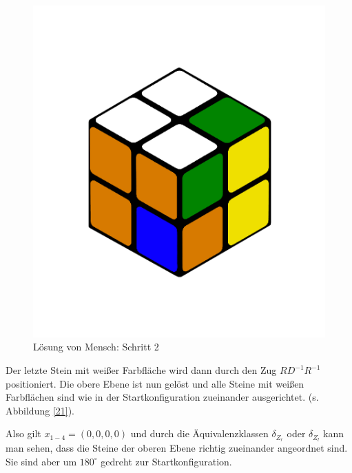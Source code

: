 \documentclass[12pt,a4paper, usenames, dvipsnames]{article}
\begin{document}
\begin{figure}[h]
\centering
\includegraphics[scale=0.12]{menschSchritt2.png}
\caption[Lösung von Mensch: Schritt 2]{Lösung von Mensch: Schritt 2}
\label{20}
\end{figure}

Der letzte Stein mit weißer Farbfläche wird dann durch den Zug $RD^{-1}R^{-1}$ positioniert. Die obere Ebene ist nun gelöst und alle Steine mit weißen Farbflächen sind wie in der Startkonfiguration zueinander ausgerichtet. (s. Abbildung \ref{21}).

Also gilt $x_{1-4} = (0,0,0,0)$ und durch die Äquivalenzklassen $\delta_{Z_r}$ oder $\delta_{Z_l}$ kann man sehen, dass die Steine der oberen Ebene richtig zueinander angeordnet sind. Sie sind aber um $180^\circ$ gedreht zur Startkonfiguration. 
\end{document}
